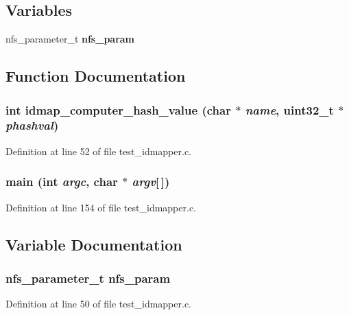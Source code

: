 \subsection*{Variables}
\begin{CompactItemize}
\item 
nfs\_\-parameter\_\-t {\bf nfs\_\-param}
\end{CompactItemize}


\subsection{Function Documentation}
\subsubsection[{idmap\_\-computer\_\-hash\_\-value}]{\setlength{\rightskip}{0pt plus 5cm}int idmap\_\-computer\_\-hash\_\-value (char $\ast$ {\em name}, \/  uint32\_\-t $\ast$ {\em phashval})}\label{test__idmapper_8c_4c0888a6963b400f9ec8dbe4ee162918}




Definition at line 52 of file test\_\-idmapper.c.
\subsubsection[{main}]{\setlength{\rightskip}{0pt plus 5cm}main (int {\em argc}, \/  char $\ast$ {\em argv}[$\,$])}\label{test__idmapper_8c_e0665038b72011f5c680c660fcb59459}




Definition at line 154 of file test\_\-idmapper.c.

\subsection{Variable Documentation}
\subsubsection[{nfs\_\-param}]{\setlength{\rightskip}{0pt plus 5cm}nfs\_\-parameter\_\-t {\bf nfs\_\-param}}\label{test__idmapper_8c_eb8fc46586993cf210777049fca03969}




Definition at line 50 of file test\_\-idmapper.c.